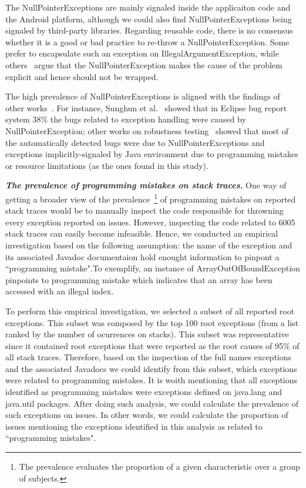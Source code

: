 \documentclass[conference]{IEEEtran}
\begin{document}
 The NullPointerExceptions are mainly signaled inside the applicaiton code and the Android platform,
 although we could also find NullPointerExceptions being signaled by third-party libraries. 
Regarding reusable code, there is no consensus whether it is a good or bad practice to 
re-throw a NullPointerException. Some prefer to encapsulate such an exception on
IllegalArgumentException, while others~\cite{bloch2008effective} argue that the
NullPointerException makes the cause of the problem explicit and hence 
should not be wrapped.

The high prevalence of NullPointerExceptions is aligned with the findings of other 
works~\cite{kim2013predicting,fraser20131600,csallner2004jcrasher}. For instance, Sunghun et
al.~\cite{kim2013predicting} showed that in Eclipse bug report system 38\% the bugs 
related to exception handling were caused by NullPointerException; other works on robustness 
testing~\cite{maji2012empirical,csallner2004jcrasher} showed that most of the automatically 
detected bugs were due to NullPointerExceptions and exceptions implicitly-signaled by Java 
environment due to programming mistakes or resource limitations
 (as the ones found in this study).

\emph{\textbf{The prevalence of programming mistakes on stack traces.}} One way of getting a broader view of the prevalence~\footnote{The prevalence evaluates the proportion of a given characteristic over a group of subjects.}  of programming mistakes on reported stack traces would be to manually inspect the code responsible for throwning every exception reported  on issues. However, inspecting the code related to 6005 stack traces can easily become infeasible.
Hence, we conducted an empirical investigation based on the following assumption: the name of the exception and its associated Javadoc 
documentaion hold enought information to pinpont a ``programming mistake".To exemplify, an instance of ArrayOutOfBoundException
 pinpoints to programming mistake which indicates that an array has been accessed with an illegal index.

To perform this empirical investigation, we selected a subset of all reported root exceptions. 
This subset was composed by the top 100 root exceptions (from a list ranked by the number of ocurrences on stacks).
This subset was representative since it contained root exceptions that were reported as the root causes of 95\% of 
all stack traces. Therefore, based on the inspection of the full names exceptions and the associated 
 Javadocs we could identify from this subset, which exceptions were related to programming mistakes.
 It is woith mentioning that  all exceptions identified as programming mistakes were exceptions defined on java.lang and java.util packages. 
After doing such analysis, we could calculate the prevalence of such exceptions on issues. In other words, we could calculate the proportion of issues mentioning the exceptions identified in this analysis as related to ``programming mistakes".
\end{document}
